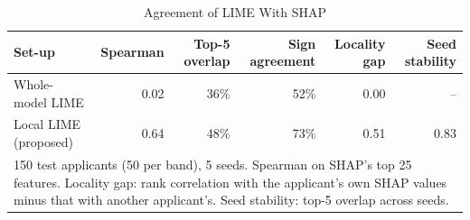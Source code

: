 \begin{table}[t]
\caption{Agreement of LIME With SHAP}
\label{tab:explanations}
\centering
\setlength{\tabcolsep}{4pt}
\begin{tabular}{lrrrrr}
\hline
\textbf{Set-up} & \textbf{Spearman} & \textbf{Top-5 overlap} & \textbf{Sign agreement} & \textbf{Locality gap} & \textbf{Seed stability} \\
\hline
Whole-model LIME & 0.02 & 36\% & 52\% & 0.00 & -- \\
Local LIME (proposed) & 0.64 & 48\% & 73\% & 0.51 & 0.83 \\
\hline
\multicolumn{6}{p{0.95\linewidth}}{\footnotesize 150 test applicants (50 per band), 5 seeds. Spearman on SHAP's top 25 features. Locality gap: rank correlation with the applicant's own SHAP values minus that with another applicant's. Seed stability: top-5 overlap across seeds.} \\
\end{tabular}
\end{table}

